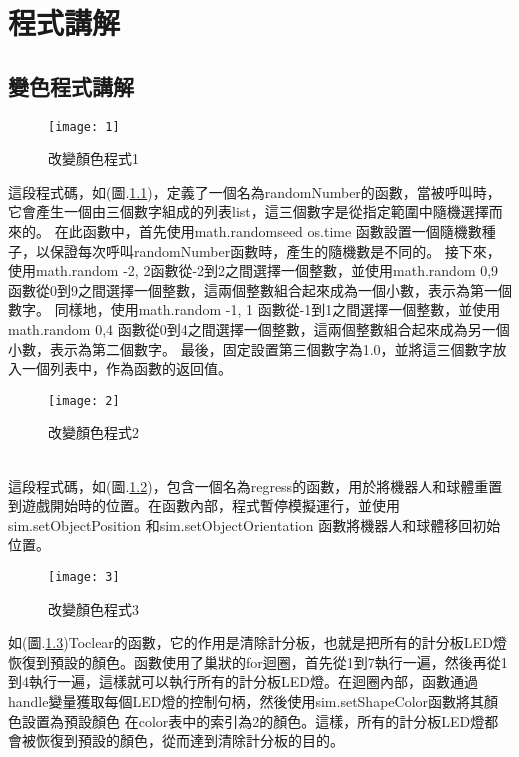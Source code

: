 \newpage
\chapter{程式講解}
\section{變色程式講解}
\begin{figure}[hbt!]
\begin{center}
\texttt{[image: 1]}
\caption{\Large 改變顏色程式1}\label{改變顏色程式1}
\end{center}
\end{figure} 
這段程式碼，如(圖.\ref{改變顏色程式1})，定義了一個名為randomNumber的函數，當被呼叫時，它會產生一個由三個數字組成的列表list，這三個數字是從指定範圍中隨機選擇而來的。 在此函數中，首先使用math.randomseed os.time 函數設置一個隨機數種子，以保證每次呼叫randomNumber函數時，產生的隨機數是不同的。 接下來，使用math.random -2, 2函數從-2到2之間選擇一個整數，並使用math.random 0,9函數從0到9之間選擇一個整數，這兩個整數組合起來成為一個小數，表示為第一個數字。 同樣地，使用math.random -1, 1 函數從-1到1之間選擇一個整數，並使用math.random 0,4 函數從0到4之間選擇一個整數，這兩個整數組合起來成為另一個小數，表示為第二個數字。 最後，固定設置第三個數字為1.0，並將這三個數字放入一個列表中，作為函數的返回值。\\
\begin{figure}[hbt!]
\begin{center}
\texttt{[image: 2]}
\caption{\Large 改變顏色程式2}\label{改變顏色程式2}
\end{center}
\end{figure} 
\\
這段程式碼，如(圖.\ref{改變顏色程式2})，包含一個名為regress的函數，用於將機器人和球體重置到遊戲開始時的位置。在函數內部，程式暫停模擬運行，並使用sim.setObjectPosition 和sim.setObjectOrientation 函數將機器人和球體移回初始位置。\\
\newpage
\begin{figure}[hbt!]
\begin{center}
\texttt{[image: 3]}
\caption{\Large 改變顏色程式3}\label{改變顏色程式3}
\end{center}
\end{figure} 
如(圖.\ref{改變顏色程式3})Toclear的函數，它的作用是清除計分板，也就是把所有的計分板LED燈恢復到預設的顏色。函數使用了巢狀的for迴圈，首先從1到7執行一遍，然後再從1到4執行一遍，這樣就可以執行所有的計分板LED燈。在迴圈內部，函數通過handle變量獲取每個LED燈的控制句柄，然後使用sim.setShapeColor函數將其顏色設置為預設顏色 在color表中的索引為2的顏色。這樣，所有的計分板LED燈都會被恢復到預設的顏色，從而達到清除計分板的目的。\\
